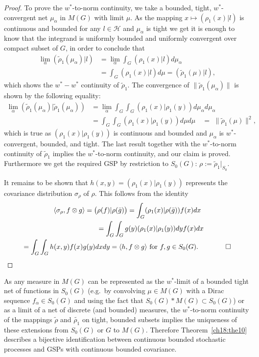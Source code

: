 \documentclass[graybox]{svmult}
\begin{document}
\begin{proof}
To prove the ${w}^*$-to-norm continuity, we take a bounded, tight,
$w^\ast$-convergent net $\mu_{\alpha}$ in $M(G)$ with limit $\mu$. As
the mapping $x \mapsto ({\rho_1}(x)|l)$ is continuous and bounded for
any $l \in \mathcal{H}$ and $\mu_{\alpha}$ is tight we get it is enough
to know that the integrand is uniformly bounded and uniformly convergent
over compact subset of $G$, in order to conclude that
%
\begin{align*}
\lim_{\alpha}(\tilde{\rho}_1(\mu_{\alpha})|l) & = \lim_{\alpha} \int_G({\rho}_1(x)|l) d\mu_{\alpha}\\
& = \int_G({\rho}_1(x)|l) d\mu
 = (\tilde{\rho}_1(\mu)|l),
\end{align*}
%
which shows the ${w}^*-{w}^*$ continuity of $\tilde{\rho}_1$.
The convergence of
$\|\tilde{\rho}_1(\mu_{\alpha}) \|$
is shown by the following equality:
%
\begin{align*}
\lim_{\alpha} (\tilde{\rho}_1(\mu_{\alpha}) | \tilde{\rho}_1(\mu_{\alpha})) & = \lim_{\alpha }\int_G \int_G
(\rho_1(x)|\rho_1(y)) d\mu_{\alpha} d\mu_{\alpha}\\
& = \int_G \int_G (\rho_1(x)|\rho_1(y)) d\mu d\mu \quad
  = \, \,  \|\tilde{\rho}_1(\mu)\|^2,
\end{align*}
which is true as $(\rho_1(x)|\rho_1(y))$ is continuous and
bounded and $\mu_{\alpha}$ is $w^\ast$-convergent,
bounded, and tight. The last result together with the
${w}^*$-to-norm continuity of $\tilde{\rho}_1$
implies the ${w}^*$-to-norm continuity, and our claim is proved.
Furthermore %
we get the required GSP by restriction to $ {S_{0}(G)}$:
$\rho  := \tilde{\rho}_{1}| _{S_{0}}$.


It remains to be shown that
$h(x,y) = (\rho _{1}(x)| \rho_{1}(y))$
represents  the covariance distribution
$\sigma _{\rho}$ of $\rho $. This follows from the identity
\begin{gather*}
\langle \sigma _{\rho},f\otimes g \rangle = \bigl( \rho (f)| \rho
(\bar{g})\bigr)  = \int^{}_{G} (\rho _{1}(x)| \rho (\bar{g})) f(x) dx \\ \quad\quad\quad\quad\quad\quad\quad=
\int^{}_{G} \int^{}_{G} g(y)(\rho _{1}(x)| \rho _{1}(y)) dy f(x) dx\\
=
\int^{}_{G} \int^{}_{G}h(x,y) f(x) g(y) dx dy
= \langle h,f\otimes g\rangle \text{ for }f,g \in {S_{0}(G)}.
\quad \quad \qed 
\end{gather*}
\end{proof}

\begin{rem}
As any measure in $M(G)$ can be represented as the
$w^\ast$-limit of a bounded tight net of functions in ${S_{0}(G)}$
(e.g.\ by convolving $\mu \in M(G)$ with a Dirac sequence
$f_\alpha \in {S_{0}(G)}$ and using the fact that ${S_{0}(G)} \ast M(G) \subset {S_{0}(G)}$)
%
or as a limit of a net of discrete (and bounded) measures, the ${w}^*$-to-norm continuity of the mappings $\tilde{\rho}$ and
$\widetilde{\rho_1}$ on tight, bounded subsets implies the uniqueness of these
extensions from ${S_{0}(G)}$ or $G$ to $M(G)$. Therefore Theorem~\ref{ch18:the10} describes a bijective identification between continuous bounded stochastic processes and GSPs with continuous bounded covariance.
\end{rem}
\end{document}
